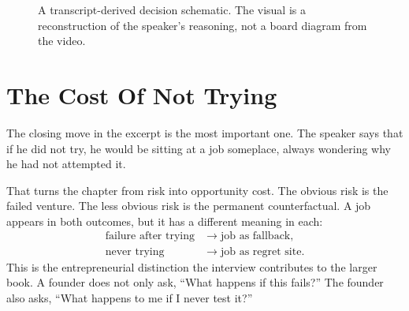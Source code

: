 \begin{figure}
\centering
{}
\caption{A transcript-derived decision schematic. The visual is a reconstruction of the speaker's reasoning, not a board diagram from the video.}
\end{figure}

\section{The Cost Of Not Trying}

The closing move in the excerpt is the most important one. The speaker says that if he did not try, he would be sitting at a job someplace, always wondering why he had not attempted it.

That turns the chapter from risk into opportunity cost. The obvious risk is the failed venture. The less obvious risk is the permanent counterfactual. A job appears in both outcomes, but it has a different meaning in each:
\begin{align}
\text{failure after trying} &\longrightarrow \text{job as fallback}, \\
\text{never trying} &\longrightarrow \text{job as regret site}.
\end{align}
This is the entrepreneurial distinction the interview contributes to the larger book. A founder does not only ask, ``What happens if this fails?'' The founder also asks, ``What happens to me if I never test it?''


